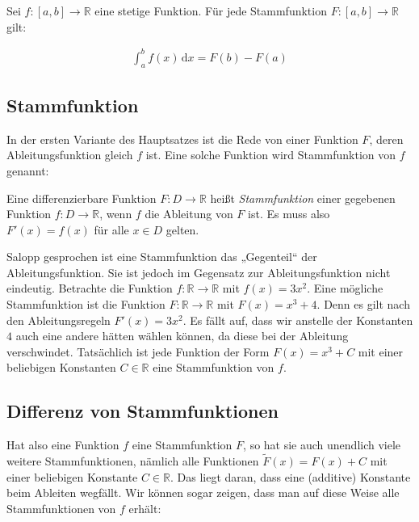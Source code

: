 \documentclass[fontsize=9pt,
               parskip=half-,
               DIV=14,
               listof=chapterentry,
               tocflat]{scrbook}
\begin{document}
\begin{theorem*}
Sei $f\colon [a,b]\to \mathbb {R} $ eine stetige Funktion. Für jede Stammfunktion $F\colon [a,b]\to \mathbb {R} $ gilt:

\begin{align*}
\int _{a}^{b}f(x)\,\mathrm {d} x=F(b)-F(a)
\end{align*}

\end{theorem*}

\subsection{Stammfunktion}

In der ersten Variante des Hauptsatzes ist die Rede von einer Funktion $F$, deren Ableitungsfunktion gleich $f$ ist. Eine solche Funktion wird Stammfunktion von $f$ genannt:

\begin{definition*}[Stammfunktion]
Eine differenzierbare Funktion $F:D\to \mathbb {R} $ heißt \emph{Stammfunktion} einer gegebenen Funktion $f:D\to \mathbb {R} $, wenn $f$ die Ableitung von $F$ ist. Es muss also $F'(x)=f(x)$ für alle $x\in D$ gelten.

\end{definition*}

Salopp gesprochen ist eine Stammfunktion das „Gegenteil“ der Ableitungsfunktion. Sie ist jedoch im Gegensatz zur Ableitungsfunktion nicht eindeutig. Betrachte die Funktion $f:\mathbb {R} \to \mathbb {R} $ mit $f(x)=3x^{2}$. Eine mögliche Stammfunktion ist die Funktion $F:\mathbb {R} \to \mathbb {R} $ mit $F(x)=x^{3}+4$. Denn es gilt nach den Ableitungsregeln $F'(x)=3x^{2}$. Es fällt auf, dass wir anstelle der Konstanten $4$ auch eine andere hätten wählen können, da diese bei der Ableitung verschwindet. Tatsächlich ist jede Funktion der Form $F(x)=x^{3}+C$ mit einer beliebigen Konstanten $C\in \mathbb {R} $ eine Stammfunktion von $f$.

\subsection{Differenz von Stammfunktionen}

Hat also eine Funktion $f$ eine Stammfunktion $F$, so hat sie auch unendlich viele weitere Stammfunktionen, nämlich alle Funktionen ${\tilde {F}}(x)=F(x)+C$ mit einer beliebigen Konstante $C\in \mathbb {R} $. Das liegt daran, dass eine (additive) Konstante beim Ableiten wegfällt. Wir können sogar zeigen, dass man auf diese Weise alle Stammfunktionen von $f$ erhält:
\end{document}
